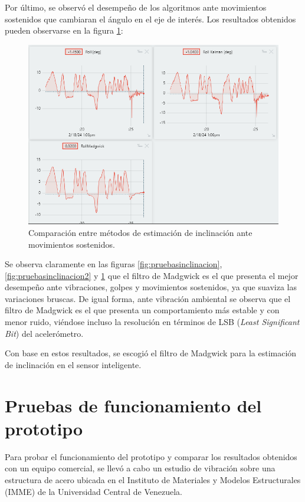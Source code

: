 Por último, se observó el desempeño de los algoritmos ante movimientos sostenidos que cambiaran el ángulo en el eje de interés. Los resultados obtenidos pueden observarse en la figura \ref{fig:pruebasinclinacion3}:

\begin{figure}[H]
    \centering
    \includegraphics[width = \textwidth]{imagenes/cap3_resultados/Pruebas ACL/Inclinacion/Comparacion M1 M2 M3 (Maggwick) ante movimiento aleatorios.png}
    \caption{Comparación entre métodos de estimación de inclinación ante movimientos sostenidos.}
    \label{fig:pruebasinclinacion3}
\end{figure}

Se observa claramente en las figuras \ref{fig:pruebasinclinacion}, \ref{fig:pruebasinclinacion2} y \ref{fig:pruebasinclinacion3} que el filtro de Madgwick es el que presenta el mejor desempeño ante vibraciones, golpes y movimientos sostenidos, ya que suaviza las variaciones bruscas. De igual forma, ante vibración ambiental se observa que el filtro de Madgwick es el que presenta un comportamiento más estable y con menor ruido, viéndose incluso la resolución en términos de LSB (\textit{Least Significant Bit}) del acelerómetro.

Con base en estos resultados, se escogió el filtro de Madgwick para la estimación de inclinación en el sensor inteligente.

\section{Pruebas de funcionamiento del prototipo}

Para probar el funcionamiento del prototipo y comparar los resultados obtenidos con un equipo comercial, se llevó a cabo un estudio de vibración sobre una estructura de acero ubicada en el Instituto de Materiales y Modelos Estructurales (IMME) de la Universidad Central de Venezuela. 

